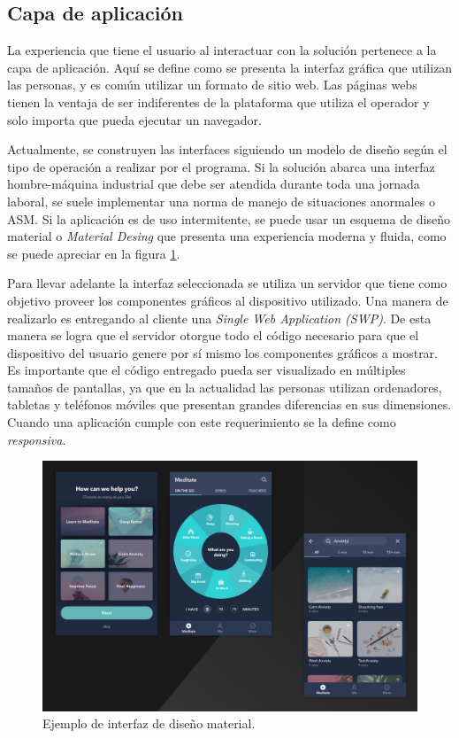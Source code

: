 \subsection{Capa de aplicación}
La experiencia que tiene el usuario al interactuar con la solución pertenece a la capa de aplicación.
Aquí se define como se presenta la interfaz gráfica que utilizan las personas, y es común utilizar un formato de sitio web.
Las páginas webs tienen la ventaja de ser indiferentes de la plataforma que utiliza el operador y solo importa que pueda ejecutar un navegador.

Actualmente, se construyen las interfaces siguiendo un modelo de diseño según el tipo de operación a realizar por el programa.
Si la solución abarca una interfaz hombre-máquina industrial que debe ser atendida durante toda una jornada laboral, se suele implementar una norma de manejo de situaciones anormales o ASM.
Si la aplicación es de uso intermitente, se puede usar un esquema de diseño material o \emph{Material Desing} que presenta una experiencia moderna y fluida, como se puede apreciar en la figura \ref{fig:ch1MaterialDesign}.

Para llevar adelante la interfaz seleccionada se utiliza un servidor que tiene como objetivo proveer los componentes gráficos al dispositivo utilizado.
Una manera de realizarlo es entregando al cliente una \emph{Single Web Application (SWP)}.
De esta manera se logra que el servidor otorgue todo el código necesario para que el dispositivo del usuario genere por sí mismo los componentes gráficos a mostrar.
Es importante que el código entregado pueda ser visualizado en múltiples tamaños de pantallas, ya que en la actualidad las personas utilizan ordenadores, tabletas y teléfonos móviles que presentan grandes diferencias en sus dimensiones.
Cuando una aplicación cumple con este requerimiento se la define como \emph{responsiva}.

\begin{figure}[h]
	\centering
	\includegraphics[width=\textwidth]{./Figures/ch1MaterialDesign.jpg}
	\caption{Ejemplo de interfaz de diseño material. \citep{WEBSITE:Material}}
	\label{fig:ch1MaterialDesign}
\end{figure}

